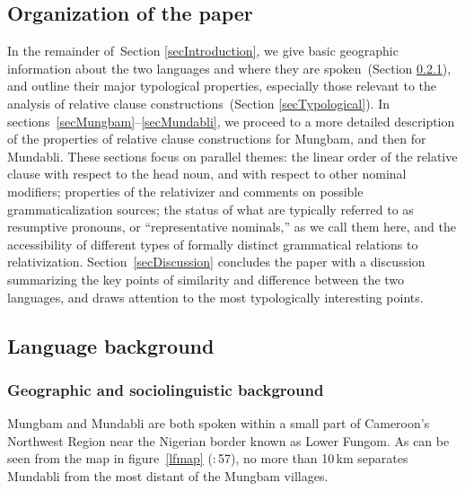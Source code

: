 \documentclass[10pt,twoside]{article}
\newcommand{\citepp}[2]{(\citealp{#1}:\,{#2})}
\newcommand{\sref}[1]{Section \ref{#1}}
\begin{document}
\subsection{Organization of the paper}
%
In the remainder of~\sref{secIntroduction},
we give basic geographic information about the two languages
and where they are spoken~(\sref{secGeographic}),
and outline their major typological properties,
especially those relevant to the analysis of relative clause
constructions~(\sref{secTypological}).
%
In sections~\ref{secMungbam}--\ref{secMundabli}, we proceed to
a more detailed description of the properties of relative clause constructions
for Mungbam, and then for Mundabli. 
These sections focus on
parallel themes: the linear order of the relative clause with respect
to the head noun, and with respect to other nominal modifiers;
properties of the relativizer and comments on possible grammaticalization sources;
the status of what are typically referred to as resumptive pronouns, 
or ``representative nominals,'' as we call them here, and
the accessibility of different types of formally distinct grammatical
%
%
relations to relativization.\footnotemark\/
%
%
Section~\ref{secDiscussion}
concludes the paper with a discussion summarizing the key points of
similarity and difference between the two languages, and draws attention
to the most typologically interesting points.
%
\subsection{Language background}\label{secLanguageBackground}
%

\subsubsection{Geographic and sociolinguistic background}\label{secGeographic}
%

Mungbam and Mundabli are both spoken within a small part of Cameroon's
Northwest Region near the Nigerian border known as Lower Fungom. As can be seen from the map
in figure~\ref{lfmap} \citepp{dicarlo:2011}{57}, no more than 10\,km separates
Mundabli from the most distant of the Mungbam villages. 
\end{document}
